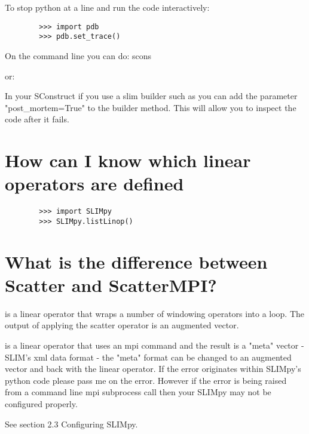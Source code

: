 \documentclass{manual}
\begin{document}
    To stop python at a line and run the code interactively:
\begin{verbatim} 
		>>> import pdb
		>>> pdb.set_trace()
\end{verbatim}
On the command line you can do: scons 
 
or: 

In your SConstruct if you use a slim builder such as  you can add the 
parameter "post_mortem=True" to the builder method. This will allow you to inspect the code after it fails. 
    
    \section*{How can I know which linear operators are defined}
\begin{verbatim} 
		>>> import SLIMpy
		>>> SLIMpy.listLinop()
\end{verbatim}
    
    \section*{What is the difference between Scatter and ScatterMPI?}
     is a linear operator that wraps a number of windowing
    operators into a loop. The output of applying the scatter operator is an
    augmented vector. 
    
     is a linear operator that uses an mpi command
    and the result is a "meta" vector - SLIM's xml data format - the "meta"
    format can be changed to an augmented vector and back with the  linear
    operator. If the error originates within SLIMpy's python code please pass me
    on the error. However if the error is being raised from a command line mpi
    subprocess call then your SLIMpy may not be configured properly. 
    
    See section 2.3 Configuring SLIMpy.
    
    
\end{document}
